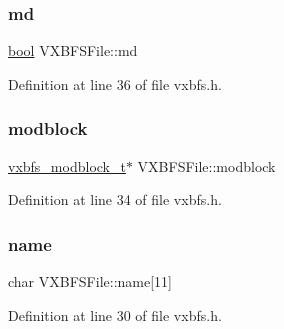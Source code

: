 \mbox{\label{a00332_adb380ce440ec23ef6c9c06d871be3c0d_adb380ce440ec23ef6c9c06d871be3c0d}} 
\subsubsection{\texorpdfstring{md}{md}}
{\footnotesize\ttfamily \hyperlink{a00140_af6a258d8f3ee5206d682d799316314b1_af6a258d8f3ee5206d682d799316314b1}{bool} V\+X\+B\+F\+S\+File\+::md}



Definition at line 36 of file vxbfs.\+h.

\mbox{\label{a00332_ac0784f3fae88428f37dfb64fd79c0004_ac0784f3fae88428f37dfb64fd79c0004}} 
\subsubsection{\texorpdfstring{modblock}{modblock}}
{\footnotesize\ttfamily \hyperlink{a00206_a0774a42f7a124b6d3054ccabd4d35463_a0774a42f7a124b6d3054ccabd4d35463}{vxbfs\+\_\+modblock\+\_\+t}$\ast$ V\+X\+B\+F\+S\+File\+::modblock}



Definition at line 34 of file vxbfs.\+h.

\mbox{\label{a00332_a07ecc9bacdc2943442f26f62f6749055_a07ecc9bacdc2943442f26f62f6749055}} 
\subsubsection{\texorpdfstring{name}{name}}
{\footnotesize\ttfamily char V\+X\+B\+F\+S\+File\+::name\mbox{[}11\mbox{]}}



Definition at line 30 of file vxbfs.\+h.

\mbox{\label{a00332_aa2c7e2e1b3827ce9fbaa045b89202784_aa2c7e2e1b3827ce9fbaa045b89202784}} 
